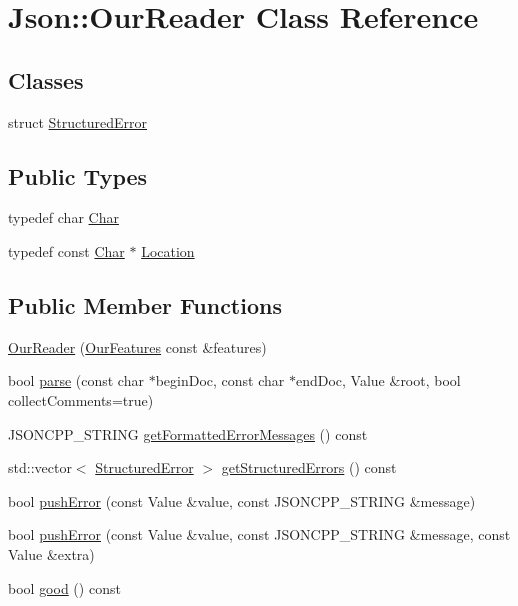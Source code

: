 \hypertarget{classJson_1_1OurReader}{\section{Json\-:\-:Our\-Reader Class Reference}
\label{classJson_1_1OurReader}
}
\subsection*{Classes}
\begin{DoxyCompactItemize}
\item 
struct \hyperlink{structJson_1_1OurReader_1_1StructuredError}{Structured\-Error}
\end{DoxyCompactItemize}
\subsection*{Public Types}
\begin{DoxyCompactItemize}
\item 
typedef char \hyperlink{classJson_1_1OurReader_a0cd0bab4caa66594ab843ccd5f9dc239}{Char}
\item 
typedef const \hyperlink{classJson_1_1OurReader_a0cd0bab4caa66594ab843ccd5f9dc239}{Char} $\ast$ \hyperlink{classJson_1_1OurReader_a1bdc7bbc52ba87cae6b19746f2ee0189}{Location}
\end{DoxyCompactItemize}
\subsection*{Public Member Functions}
\begin{DoxyCompactItemize}
\item 
\hyperlink{classJson_1_1OurReader_a48a850914b9c8d7781be172930c478e5}{Our\-Reader} (\hyperlink{classJson_1_1OurFeatures}{Our\-Features} const \&features)
\item 
bool \hyperlink{classJson_1_1OurReader_aba4f8749aab7f02ec17f107e392caf80}{parse} (const char $\ast$begin\-Doc, const char $\ast$end\-Doc, Value \&root, bool collect\-Comments=true)
\item 
J\-S\-O\-N\-C\-P\-P\-\_\-\-S\-T\-R\-I\-N\-G \hyperlink{classJson_1_1OurReader_a61b627b274f3bf110d559e4ab50e29b8}{get\-Formatted\-Error\-Messages} () const 
\item 
std\-::vector$<$ \hyperlink{structJson_1_1OurReader_1_1StructuredError}{Structured\-Error} $>$ \hyperlink{classJson_1_1OurReader_a02ef7871af3706754a233c36e6d489e9}{get\-Structured\-Errors} () const 
\item 
bool \hyperlink{classJson_1_1OurReader_a700e9d8e0977fa7e0375d26690d7025f}{push\-Error} (const Value \&value, const J\-S\-O\-N\-C\-P\-P\-\_\-\-S\-T\-R\-I\-N\-G \&message)
\item 
bool \hyperlink{classJson_1_1OurReader_addccecfca74b79adaad6115ddd614477}{push\-Error} (const Value \&value, const J\-S\-O\-N\-C\-P\-P\-\_\-\-S\-T\-R\-I\-N\-G \&message, const Value \&extra)
\item 
bool \hyperlink{classJson_1_1OurReader_a048346238d703ad9aed06beb686e6102}{good} () const 
\end{DoxyCompactItemize}


